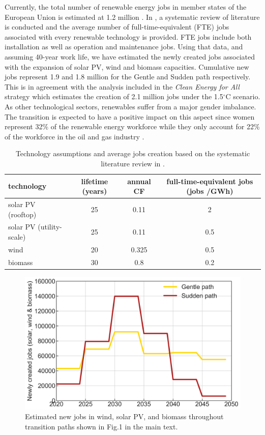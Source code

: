 \documentclass[3p]{elsarticle} %
\begin{document}
Currently, the total number of renewable energy jobs in member states of the European Union is estimated at 1.2 million \cite{IRENA_jobs}. In \cite{Low_carbon_jobs}, a systematic review of literature is conducted and the average number of full-time-equivalent (FTE) jobs associated with every renewable technology is provided. FTE jobs include both installation as well as operation and maintenance jobs.  Using that data, and assuming 40-year work life, we have estimated the newly created jobs associated with the expansion of solar PV, wind and biomass capacities. Cumulative new jobs represent 1.9 and 1.8 million for the Gentle and Sudden path respectively. This is in agreement with the analysis included in the \textsl{Clean Energy for All} strategy \cite{in-depth_2018} which estimates the creation of 2.1 million jobs under the 1.5$^{\circ}$C scenario. As other technological sectors, renewables suffer from a major gender imbalance. The transition is expected to have a positive impact on this aspect since women represent 32\% of the renewable energy workforce while they only account for 22\% of the workforce in the oil and gas industry \cite{IRENA_gender}. 

\begin{table}[!h]
\footnotesize
\centering
\begin{threeparttable}
\caption{Technology assumptions and average jobs creation based on the systematic literature review in \cite{Low_carbon_jobs}.} \label{tab_jobs}
\centering
\begin{tabularx}{13cm}{lccc}
\toprule
	technology & lifetime (years) &	annual CF &	full-time-equivalent jobs (jobs /GWh) \\
\midrule
solar PV (rooftop) 	& 25	& 0.11 &	2 \\
solar PV (utility-scale)	& 25	& 0.11 &	0.5 \\
wind	& 20	& 0.325 &	0.5 \\
biomass	& 30	& 0.8	& 0.2 \\
\bottomrule
\end{tabularx}
\end{threeparttable}
\end{table}

\begin{figure}[!h]
\centering
\includegraphics[width=0.5\columnwidth]{figures/jobs.png}
\caption{Estimated new jobs in wind, solar PV, and biomass throughout transition paths shown in Fig.1 in the main text.} \label{fig_jobs} 
\end{figure}
\end{document}

